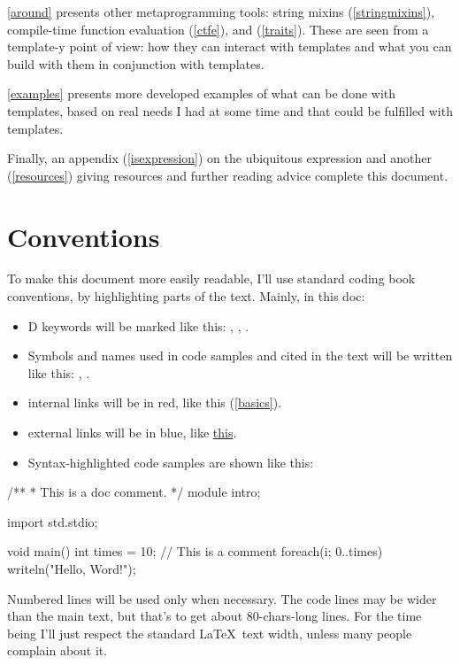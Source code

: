 \autoref{around} presents other meta\-pro\-gram\-ming tools: string mixins (\ref{stringmixins}), compile-time function evaluation (\ref{ctfe}), and  (\ref{traits}). These are seen from a \mbox{template-y} point of view: how they can interact with templates and what you can build with them in conjunction with templates.

\autoref{examples} presents more developed examples of what can be done with templates, based on real needs I had at some time and that could be fulfilled with templates.

Finally, an appendix (\autoref{isexpression}) on the ubiquitous  expression  and another (\ref{resources}) giving resources and further reading advice complete this document.

\section*{Conventions}\label{conventions}

To make this document more easily readable, I'll use standard coding book conventions, by highlighting parts of the text. Mainly, in this doc:

\begin{itemize}
\item D keywords will be marked like this: , , .
\item Symbols and names used in code samples and cited in the text will be written like this: , .
\item internal links will be in red, like this (\ref{basics}).
\item external links will be in blue, like \href{http://www.dlang.org}{this}.
\item Syntax-highlighted code samples are shown like this:
\end{itemize}

\begin{ndcode}
/**
 * This is a doc comment.
 */
module intro;

import std.stdio;

void main()
{
    int times = 10;
    // This is a comment
    foreach(i; 0..times) 
        writeln("Hello, Word!");
}
\end{ndcode}

Numbered lines will be used only when necessary. The code lines may be wider than the main text, but that's to get about 80-chars-long lines. For the time being I'll just respect the standard \LaTeX\ text width, unless many people complain about it.

